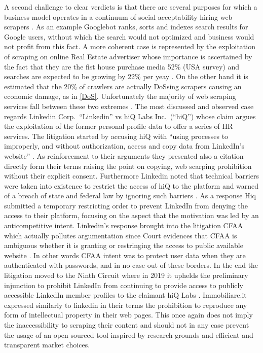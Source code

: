 \documentclass[
  12pt,
  a4paper,
  oneside]{book}
\theoremstyle{definition}
\theoremstyle{definition}
\theoremstyle{definition}
\theoremstyle{remark}
\begin{document}
A second challenge to clear verdicts is that there are several purposes for which a business model operates in a continuum of social acceptability hiring web scrapers \citep{ADetaile90}. As an example Googlebot ranks, sorts and indexes search results for Google users, without which the search would not optimized and business would not profit from this fact. A more coherent case is represented by the exploitation of scraping on online Real Estate advertiser whose importance is ascertained by the fact that they are the fist house purchase media 52\% (USA survey) and searches are expected to be growing by 22\% per yeay \citep{peterson2003consumer}. On the other hand it is estimated that the 20\% of crawlers are actually DoSsing scrapers \citep{TheInter5} causing an economic damage, as in \ref{DoS}. Unfortunately the majority of web scraping services fall between these two extremes \citeyearpar{WhatCour57}.
The most discussed and observed case regards Linkedin Corp.~``Linkedin'' vs hiQ Labs Inc.~(``hiQ'') whose claim argues the exploitation of the former personal profile data to offer a series of HR services. The litigation started by accusing hiQ with ``using processes to improperly, and without authorization, access and copy data from LinkedIn's website'' \citep{Letterfr71}. As reinforcement to their arguments they presented also a citation directly form their terms raising the point on copying, web scarping prohibition without their explicit consent. Furthermore Linkedin noted that technical barriers were taken into existence to restrict the access of hiQ to the platform and warned of a breach of state and federal law by ignoring such barriers \citeyearpar{WhatCour57}. As a response Hiq submitted a temporary restricting order to prevent LinkedIn from denying the access to their platform, focusing on the aspect that the motivation was led by an anticompetitive intent. Linkedin's response brought into the litigation CFAA which actually pollutes argumentation since Court evidences that CFAA is ambiguous whether it is granting or restringing the access to public available website \citep{hiQLabsI66}. In other words CFAA intent was to protect user data when they are authenticated with passwords, and in no case out of these borders. In the end the litigation moved to the Ninth Circuit where in 2019 it uphelds the preliminary injunction to prohibit LinkedIn from continuing to provide access to publicly accessible LinkedIn member profiles to the claimant hiQ Labs \citep{wiki:HiQvsLinkedIn}.
Immobiliare.it expressed similarly to linkedin in their terms \citep{immobiliareterms} the prohibition to reproduce any form of intellectual property in their web pages. This once again does not imply the inaccessibility to scraping their content and should not in any case prevent the usage of an open sourced tool inspired by research grounds and efficient and transparent market choices.
\end{document}
